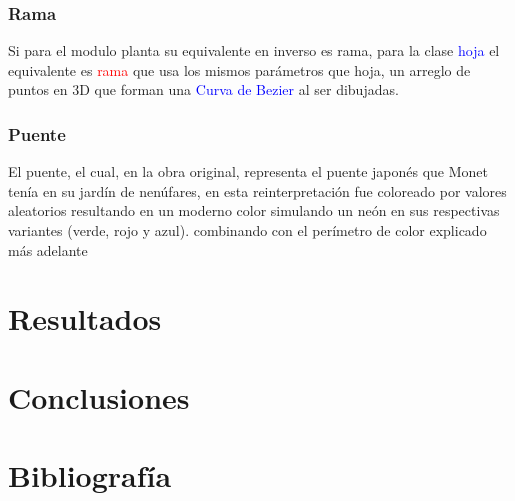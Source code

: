 \documentclass[11pt,a4paper]{article}
\begin{document}
			\subsubsection{Rama}

			Si para el modulo planta su equivalente en inverso es rama, para la clase \textcolor{blue}{hoja} el equivalente es \textcolor{red}{rama} que usa los mismos parámetros que hoja, un arreglo de puntos en 3D que forman una \textcolor{blue}{Curva de Bezier} al ser dibujadas.

			\subsubsection{Puente}
			El puente, el cual, en la obra original, representa el puente japonés que Monet tenía en su jardín de nenúfares, en esta reinterpretación fue coloreado por valores aleatorios resultando en un moderno color simulando un neón en sus respectivas variantes (verde, rojo y azul). combinando con el perímetro de color explicado más adelante




\section{Resultados}
\section{Conclusiones}
\section{Bibliografía}


 	
\end{document}
